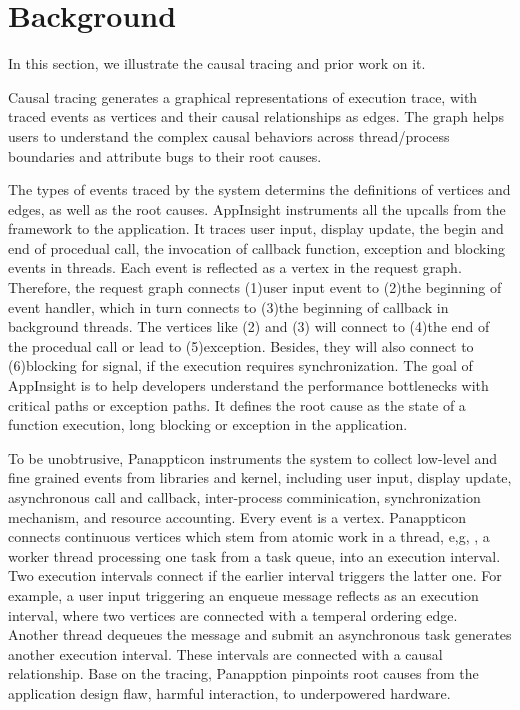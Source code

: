 \section{Background} \label{sec:background}

In this section, we illustrate the causal tracing and prior work on it.

Causal tracing generates a graphical representations of execution trace, with
traced events as vertices and their causal relationships as edges. The graph
helps users to understand the complex causal behaviors across thread/process
boundaries and attribute bugs to their root causes.

The types of events traced by the system determins the definitions of vertices
and edges, as well as the root causes. AppInsight instruments all the upcalls
from the framework to the application. It traces user input, display update,
the begin and end of procedual call, the invocation of callback function,
exception and blocking events in threads. Each event is reflected as a vertex
in the request graph. Therefore, the request graph connects (1)user input
event to (2)the beginning of event handler, which in turn connects to (3)the
beginning of callback in background threads. The vertices like (2) and (3) will
connect to (4)the end of the procedual call or lead to (5)exception. Besides,
they will also connect to (6)blocking for signal, if the execution requires
synchronization. The goal of AppInsight is to help developers understand the
performance bottlenecks with critical paths or exception paths. It defines the
root cause as the state of a function execution, long blocking or exception in
the application.

To be unobtrusive, Panappticon instruments the system to collect low-level
and fine grained events from libraries and kernel, including user input,
display update, asynchronous call and callback, inter-process comminication,
synchronization mechanism, and resource accounting. Every event is a vertex.
Panappticon connects continuous vertices which stem from atomic work in a
thread, e,g, , a worker thread processing one task from a task queue, into an
execution interval. Two execution intervals connect if the earlier interval
triggers the latter one. For example, a user input triggering an enqueue
message reflects as an execution interval, where two vertices are connected
with a temperal ordering edge. Another thread dequeues the message and submit
an asynchronous task generates another execution interval. These intervals
are connected with a causal relationship. Base on the tracing, Panapption
pinpoints root causes from the application design flaw, harmful interaction, to
underpowered hardware.
